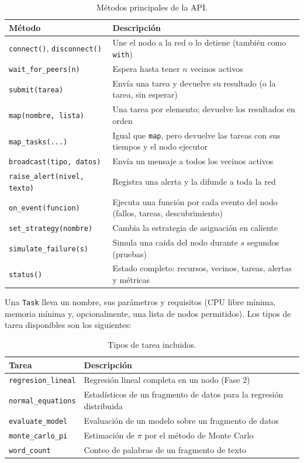\begin{table}[htbp]
\centering
\small
\begin{tabular}{|p{}|p{}|}
\hline
\textbf{Método} & \textbf{Descripción} \\ \hline
\texttt{connect()}, \texttt{disconnect()} & Une el nodo a la red o lo detiene (también como \texttt{with}) \\ \hline
\texttt{wait\_for\_peers(n)} & Espera hasta tener $n$ vecinos activos \\ \hline
\texttt{submit(tarea)} & Envía una tarea y devuelve su resultado (o la tarea, sin esperar) \\ \hline
\texttt{map(nombre, lista)} & Una tarea por elemento; devuelve los resultados en orden \\ \hline
\texttt{map\_tasks(...)} & Igual que \texttt{map}, pero devuelve las tareas con sus tiempos y el nodo ejecutor \\ \hline
\texttt{broadcast(tipo, datos)} & Envía un mensaje a todos los vecinos activos \\ \hline
\texttt{raise\_alert(nivel, texto)} & Registra una alerta y la difunde a toda la red \\ \hline
\texttt{on\_event(funcion)} & Ejecuta una función por cada evento del nodo (fallos, tareas, descubrimiento) \\ \hline
\texttt{set\_strategy(nombre)} & Cambia la estrategia de asignación en caliente \\ \hline
\texttt{simulate\_failure(s)} & Simula una caída del nodo durante $s$ segundos (pruebas) \\ \hline
\texttt{status()} & Estado completo: recursos, vecinos, tareas, alertas y métricas \\ \hline
\end{tabular}
\caption{Métodos principales de la API.}
\label{tab:api}
\end{table}

Una \texttt{Task} lleva un nombre, sus parámetros y requisitos (CPU libre mínima, memoria mínima y,
opcionalmente, una lista de nodos permitidos). Los tipos de tarea disponibles son los siguientes:

\begin{table}[htbp]
\centering
\small
\begin{tabular}{|l|p{}|}
\hline
\textbf{Tarea} & \textbf{Descripción} \\ \hline
\texttt{regresion\_lineal} & Regresión lineal completa en un nodo (Fase 2) \\ \hline
\texttt{normal\_equations} & Estadísticos de un fragmento de datos para la regresión distribuida \\ \hline
\texttt{evaluate\_model} & Evaluación de un modelo sobre un fragmento de datos \\ \hline
\texttt{monte\_carlo\_pi} & Estimación de $\pi$ por el método de Monte Carlo \\ \hline
\texttt{word\_count} & Conteo de palabras de un fragmento de texto \\ \hline
\end{tabular}
\caption{Tipos de tarea incluidos.}
\label{tab:tareas}
\end{table}

